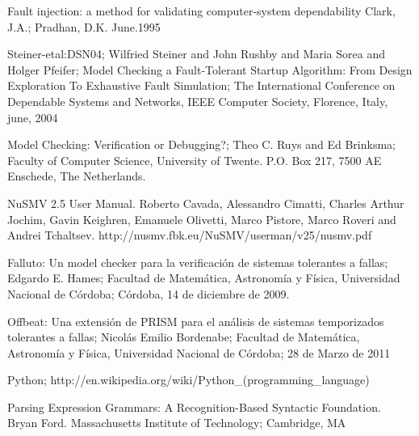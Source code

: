 \documentclass[titlepage, 12pt]{book}
\begin{document}
\begin{thebibliography}{99}

 Fault injection: a method for validating computer-system dependability
Clark, J.A.; Pradhan, D.K. June.1995 

 Steiner-etal:DSN04; Wilfried Steiner and John Rushby and Maria Sorea and Holger Pfeifer; Model Checking a Fault-Tolerant Startup Algorithm: From Design Exploration To Exhaustive Fault Simulation; The International Conference on Dependable Systems and Networks, IEEE Computer Society, Florence, Italy, june, 2004

 Model Checking: Verification or Debugging?; Theo C. Ruys and Ed Brinksma; Faculty of Computer Science, University of Twente. P.O. Box 217, 7500 AE Enschede, The Netherlands.

 NuSMV 2.5 User Manual. Roberto Cavada, Alessandro Cimatti, Charles Arthur Jochim, Gavin Keighren,
Emanuele Olivetti, Marco Pistore, Marco Roveri and Andrei Tchaltsev. http://nusmv.fbk.eu/NuSMV/userman/v25/nusmv.pdf

 Falluto: Un model checker para la verificaci\'on de sistemas tolerantes a fallas; Edgardo E. Hames; Facultad de Matem\'atica, Astronom\'ia y F\'isica, Universidad Nacional de C\'ordoba; C\'ordoba, 14 de diciembre de 2009.

 Offbeat: Una extensi\'on de PRISM para el an\'alisis de sistemas temporizados tolerantes a fallas; Nicolás Emilio Bordenabe; Facultad de Matem\'atica, Astronom\'ia y F\'isica, Universidad Nacional de C\'ordoba; 28 de Marzo de 2011




 Python; http://en.wikipedia.org/wiki/Python\_(programming\_language)

 Parsing Expression Grammars: A Recognition-Based Syntactic Foundation. Bryan Ford. Massachusetts Institute of Technology; Cambridge, MA


\end{thebibliography}
\end{document}
